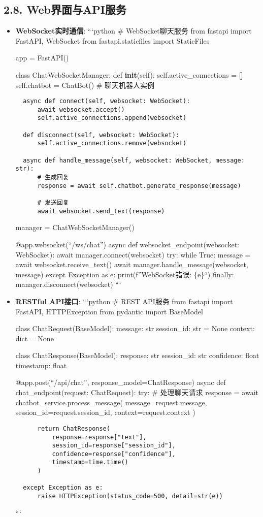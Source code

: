 \subsection{2.8.
Web界面与API服务}\label{webux754cux9762ux4e0eapiux670dux52a1}

\begin{itemize}
\item
  \textbf{WebSocket实时通信}: ```python \# WebSocket聊天服务 from
  fastapi import FastAPI, WebSocket from fastapi.staticfiles import
  StaticFiles

  app = FastAPI()

  class ChatWebSocketManager: def \textbf{init}(self):
  self.active\_connections = {[}{]} self.chatbot = ChatBot() \#
  聊天机器人实例

\begin{lstlisting}
  async def connect(self, websocket: WebSocket):
      await websocket.accept()
      self.active_connections.append(websocket)

  def disconnect(self, websocket: WebSocket):
      self.active_connections.remove(websocket)

  async def handle_message(self, websocket: WebSocket, message: str):
      # 生成回复
      response = await self.chatbot.generate_response(message)

      # 发送回复
      await websocket.send_text(response)
\end{lstlisting}

  manager = ChatWebSocketManager()

  @app.websocket(``/ws/chat'') async def websocket\_endpoint(websocket:
  WebSocket): await manager.connect(websocket) try: while True: message
  = await websocket.receive\_text() await
  manager.handle\_message(websocket, message) except Exception as e:
  print(f''WebSocket错误: \{e\}``) finally:
  manager.disconnect(websocket) ```
\item
  \textbf{RESTful API接口}: ```python \# REST API服务 from fastapi
  import FastAPI, HTTPException from pydantic import BaseModel

  class ChatRequest(BaseModel): message: str session\_id: str = None
  context: dict = None

  class ChatResponse(BaseModel): response: str session\_id: str
  confidence: float timestamp: float

  @app.post(``/api/chat'', response\_model=ChatResponse) async def
  chat\_endpoint(request: ChatRequest): try: \# 处理聊天请求 response =
  await chatbot\_service.process\_message( message=request.message,
  session\_id=request.session\_id, context=request.context )

\begin{lstlisting}
      return ChatResponse(
          response=response["text"],
          session_id=response["session_id"],
          confidence=response["confidence"],
          timestamp=time.time()
      )

  except Exception as e:
      raise HTTPException(status_code=500, detail=str(e))
\end{lstlisting}

  ```
\end{itemize}

